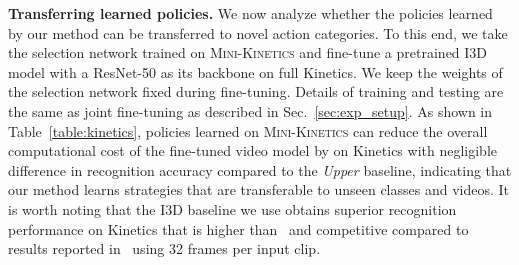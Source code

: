 \documentclass[final]{cvpr}
\newcommand{\minik}{{\scshape Mini-Kinetics}\xspace}
\begin{document}
\begin{table}[!h]  \centering
    \vspace{-0.1in}
    \caption{\textbf{Transferring learned policies.} We fine-tune a Kinetics pretrained model on Kinetics full training set, with policies learned on Mini-Kinetics, and evaluate on Kinetics validation set.}
    \label{table:kinetics}
    \end{table}

\noindent\textbf{Transferring learned policies.} We now analyze whether the policies learned by our method can be transferred to novel action categories. To this end, we take the selection network trained on \minik and fine-tune a pretrained I3D model with a ResNet-50 as its backbone on full Kinetics. We keep the weights of the selection network fixed during fine-tuning. Details of training and testing are the same as joint fine-tuning as described in Sec.~\ref{sec:exp_setup}.
As shown in Table~\ref{table:kinetics}, policies learned on \minik can reduce the overall computational cost of the fine-tuned video model by  on Kinetics with negligible difference in recognition accuracy compared to the \emph{Upper} baseline, indicating that our method learns strategies that are transferable to unseen classes and videos. It is worth noting that the I3D baseline we use obtains superior recognition performance on Kinetics that is higher than~\cite{quovadis,s3d} and competitive compared to results reported in~\cite{nonlocal} using 32 frames per input clip.
\end{document}
